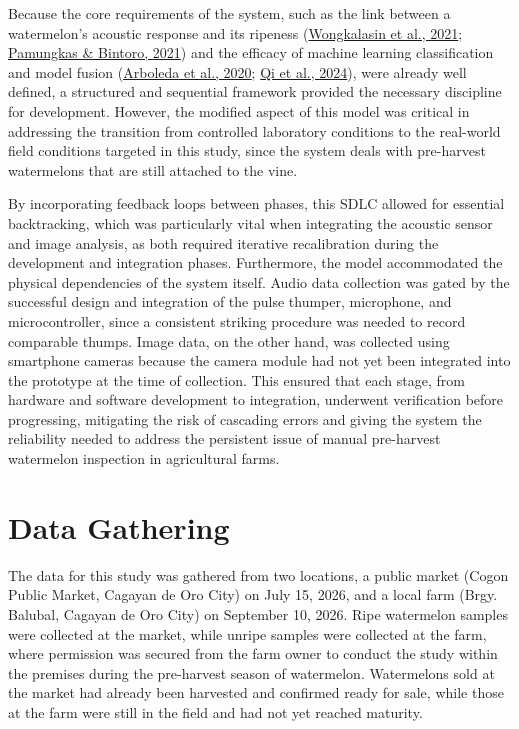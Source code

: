 \begin{thesisprose}
Because the core requirements of the system, such as the link between a watermelon’s acoustic response and its ripeness (\hyperlink{cite.wongkalasin2021}{Wongkalasin et al., 2021}; \hyperlink{cite.pamungkas2021}{Pamungkas \& Bintoro, 2021}) and the efficacy of machine learning classification and model fusion (\hyperlink{cite.arboleda2020}{Arboleda et al., 2020}; \hyperlink{cite.qi2024}{Qi et al., 2024}), were already well defined, a structured and sequential framework provided the necessary discipline for development. However, the modified aspect of this model was critical in addressing the transition from controlled laboratory conditions to the real-world field conditions targeted in this study, since the system deals with pre-harvest watermelons that are still attached to the vine.

By incorporating feedback loops between phases, this SDLC allowed for essential backtracking, which was particularly vital when integrating the acoustic sensor and image analysis, as both required iterative recalibration during the development and integration phases. Furthermore, the model accommodated the physical dependencies of the system itself. Audio data collection was gated by the successful design and integration of the pulse thumper, microphone, and microcontroller, since a consistent striking procedure was needed to record comparable thumps. Image data, on the other hand, was collected using smartphone cameras because the camera module had not yet been integrated into the prototype at the time of collection. This ensured that each stage, from hardware and software development to integration, underwent verification before progressing, mitigating the risk of cascading errors and giving the system the reliability needed to address the persistent issue of manual pre-harvest watermelon inspection in agricultural farms.

\section{Data Gathering}

The data for this study was gathered from two locations, a public market (Cogon Public Market, Cagayan de Oro City) on July 15, 2026, and a local farm (Brgy. Balubal, Cagayan de Oro City) on September 10, 2026. Ripe watermelon samples were collected at the market, while unripe samples were collected at the farm, where permission was secured from the farm owner to conduct the study within the premises during the pre-harvest season of watermelon. Watermelons sold at the market had already been harvested and confirmed ready for sale, while those at the farm were still in the field and had not yet reached maturity.


\end{thesisprose}
